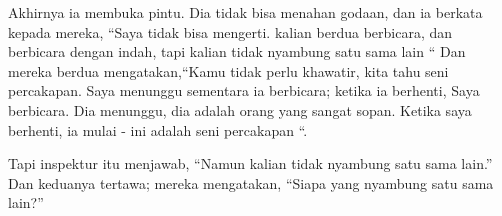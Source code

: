Akhirnya ia membuka pintu. Dia tidak bisa menahan godaan, dan ia berkata kepada mereka, “Saya tidak bisa mengerti. kalian berdua berbicara, dan berbicara dengan indah, tapi kalian tidak nyambung satu sama lain “ Dan mereka berdua mengatakan,“Kamu tidak perlu khawatir, kita tahu seni percakapan. Saya menunggu sementara ia berbicara; ketika ia berhenti, Saya berbicara. Dia menunggu, dia adalah orang yang sangat sopan. Ketika saya berhenti, ia mulai - ini adalah seni percakapan “.

Tapi inspektur itu menjawab, “Namun kalian tidak nyambung satu sama lain.” Dan keduanya tertawa; mereka mengatakan, “Siapa yang nyambung satu sama lain?”














